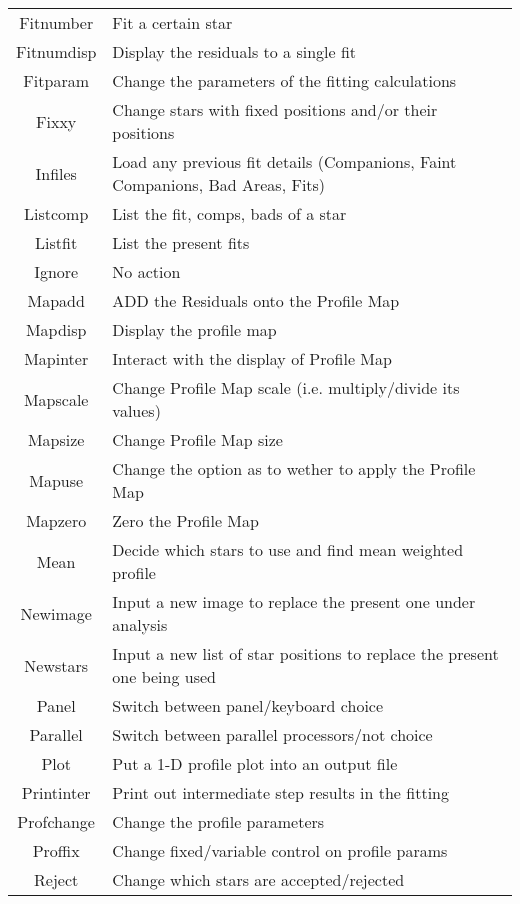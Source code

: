 {{\begin{tabular}{|c|p{4.5in}|}\hline
 Fitnumber  & Fit a certain star \\
 Fitnumdisp & Display the residuals to a single fit \\
 Fitparam   & Change the parameters of the fitting calculations \\
 Fixxy      & Change stars with fixed positions and/or their
               positions \\
 Infiles    & Load any previous fit details (Companions, Faint
               Companions, Bad Areas, Fits) \\
 Listcomp   & List the fit, comps, bads of a star \\
 Listfit    & List the present fits \\
 Ignore     & No action \\
 Mapadd     & ADD the Residuals onto the Profile Map \\
 Mapdisp    & Display the profile map \\
 Mapinter   & Interact with the display of Profile Map \\
 Mapscale   & Change Profile Map scale (i.e. multiply/divide its
               values) \\
 Mapsize    & Change Profile Map size \\
 Mapuse     & Change the option as to wether to apply the 
               Profile Map \\
 Mapzero    & Zero the Profile Map \\
 Mean       & Decide which stars to use and find mean weighted
               profile \\
 Newimage   & Input a new image to replace the present one under
               analysis \\
 Newstars   & Input a new list of star positions to replace the
               present one being used \\
 Panel      & Switch between panel/keyboard choice \\
 Parallel   & Switch between parallel processors/not choice \\
 Plot       & Put a 1-D profile plot into an output file \\
 Printinter & Print out intermediate step results in the fitting \\
 Profchange & Change the profile parameters \\
 Proffix    & Change fixed/variable control on profile params \\
 Reject     & Change which stars are accepted/rejected \\

\end{tabular}}}
